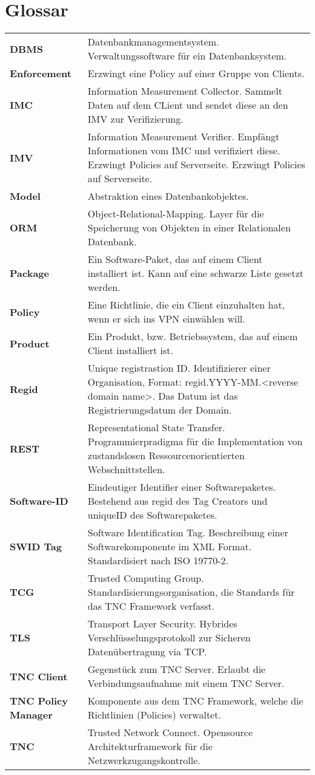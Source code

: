 \chapter{Glossar}

{
\renewcommand{\arraystretch}{1.5}
\begin{longtable}{l >{\raggedright}p{}}
\textbf{DBMS} & Datenbankmanagementsystem. Verwaltungssoftware für ein Datenbanksystem.\tabularnewline
\textbf{Enforcement} & Erzwingt eine Policy auf einer Gruppe von Clients.\tabularnewline
\textbf{IMC} & Information Measurement Collector. Sammelt Daten auf dem CLient und sendet diese an den IMV zur Verifizierung.\tabularnewline
\textbf{IMV} & Information Measurement Verifier. Empfängt Informationen vom IMC und verifiziert diese. Erzwingt Policies auf Serverseite. Erzwingt Policies auf Serverseite.\tabularnewline
\textbf{Model} & Abstraktion eines Datenbankobjektes.\tabularnewline
\textbf{ORM} & Object-Relational-Mapping. Layer für die Speicherung von Objekten in einer Relationalen Datenbank.\tabularnewline
\textbf{Package} & Ein Software-Paket, das auf einem Client installiert ist. Kann auf eine schwarze Liste gesetzt werden.\tabularnewline
\textbf{Policy} & Eine Richtlinie, die ein Client einzuhalten hat, wenn er sich ins VPN einwählen will.\tabularnewline
\textbf{Product} & Ein Produkt, bzw. Betriebssystem, das auf einem Client installiert ist.\tabularnewline
\textbf{Regid} & Unique registrastion ID. Identifizierer einer Organisation, Format: regid.YYYY-MM.<reverse domain name>. Das Datum ist das Registrierungsdatum der Domain.\tabularnewline
\textbf{REST} & Representational State Transfer. Programmierpradigma für die Implementation von zustandslosen Ressourcenorientierten Webschnittstellen.\tabularnewline
\textbf{Software-ID} & Eindeutiger Identifier einer Softwarepaketes. Bestehend aus regid des Tag Creators und uniqueID des Softwarepaketes.\tabularnewline
\textbf{SWID Tag} & Software Identification Tag. Beschreibung einer Softwarekomponente im XML Format. Standardisiert nach ISO 19770-2.\tabularnewline
\textbf{TCG} & Trusted Computing Group. Standardisierungsorganisation, die Standards für das TNC Framework verfasst.\tabularnewline
\textbf{TLS} & Transport Layer Security. Hybrides Verschlüsselungsprotokoll zur Sicheren Datenübertragung via TCP.\tabularnewline
\textbf{TNC Client} & Gegenstück zum TNC Server. Erlaubt die Verbindungsaufnahme mit einem TNC Server.\tabularnewline
\textbf{TNC Policy Manager} & Komponente aus dem TNC Framework, welche die Richtlinien (Policies) verwaltet.\tabularnewline
\textbf{TNC} & Trusted Network Connect. Opensource Architekturframework für die Netzwerkzugangskontrolle.\tabularnewline

\end{longtable}}
